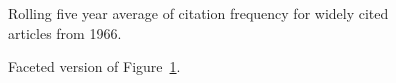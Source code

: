 \documentclass[
  10pt,
  letterpaper,
  DIV=11,
  numbers=noendperiod,
  twoside]{scrartcl}
\begin{document}
\begin{figure}


\caption{\label{fig-citation-spaghetti-1966}Rolling five year average of
citation frequency for widely cited articles from 1966.}

\end{figure}%

\begin{figure}


\caption{\label{fig-citation-facet-1966}Faceted version of
Figure~\ref{fig-citation-spaghetti-1966}.}

\end{figure}%
\end{document}
